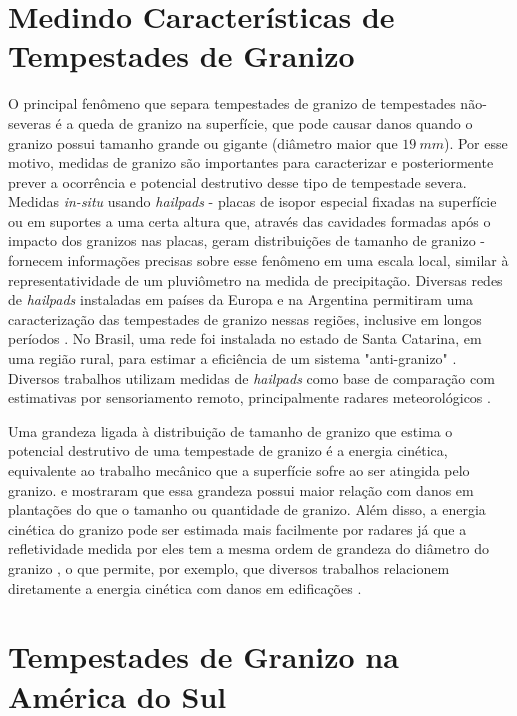 \section{Medindo Características de Tempestades de Granizo}

O principal fenômeno que separa tempestades de granizo de tempestades não-severas é a queda de granizo na superfície, que pode causar danos quando o granizo possui tamanho grande ou gigante (diâmetro maior que $19\:mm$). Por esse motivo, medidas de granizo são importantes para caracterizar e posteriormente prever a ocorrência e potencial destrutivo desse tipo de tempestade severa. Medidas \textit{in-situ} usando \textit{hailpads} - placas de isopor especial fixadas na superfície ou em suportes a uma certa altura que, através das cavidades formadas após o impacto dos granizos nas placas, geram distribuições de tamanho de granizo \cite{Schleusener1960a, Decker1961} - fornecem informações precisas sobre esse fenômeno em uma escala local, similar à representatividade de um pluviômetro na medida de precipitação. Diversas redes de \textit{hailpads} instaladas em países da Europa \cite{Dessens1998, Svabik1989, Giaiotti2003, Pocakal2009, Berthet2011} e na Argentina \cite{Sanchez2009} permitiram uma caracterização das tempestades de granizo nessas regiões, inclusive em longos períodos \cite{Berthet2013}. No Brasil, uma rede foi instalada no estado de Santa Catarina, em uma região rural, para estimar a eficiência de um sistema "anti-granizo" \cite{Iliine2010}. Diversos trabalhos utilizam medidas de \textit{hailpads} como base de comparação com estimativas por sensoriamento remoto, principalmente radares meteorológicos \cite{Waldvogel1978a, Schmid1992, Sanchez2013}.

Uma grandeza ligada à distribuição de tamanho de granizo que estima o potencial destrutivo de uma tempestade de granizo é a energia cinética, equivalente ao trabalho mecânico que a superfície sofre ao ser atingida pelo granizo.  e  mostraram que essa grandeza possui maior relação com danos em plantações do que o tamanho ou quantidade de granizo. Além disso, a energia cinética do granizo pode ser estimada mais facilmente por radares já que a refletividade medida por eles tem a mesma ordem de grandeza do diâmetro do granizo \cite{Waldvogel1978a}, o que permite, por exemplo, que diversos trabalhos relacionem diretamente a energia cinética com danos em edificações \cite{Hohl2002, Schuster2006}.

\section{Tempestades de Granizo na América do Sul}

